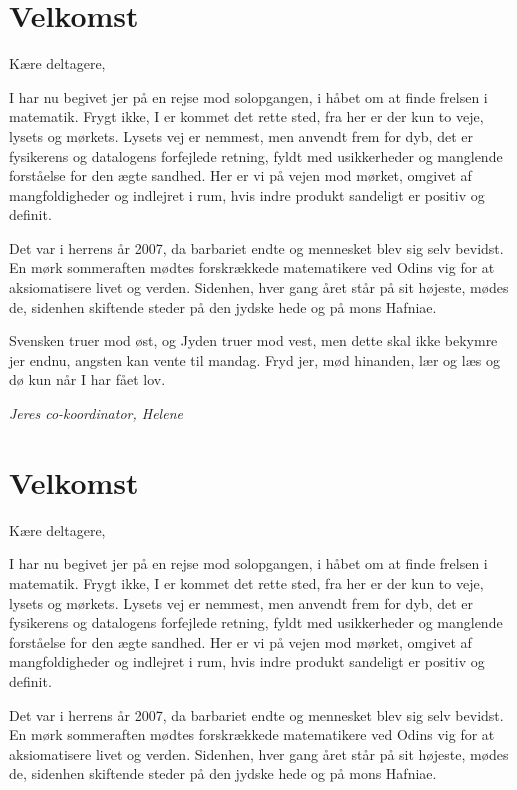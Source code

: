 

\begin{minipage}[b]{0.95\linewidth}
\begin{minipage}[t]{0.47\textwidth}
\vspace{3mm}

\section*{Velkomst}
Kære deltagere,

I har nu begivet jer på en rejse mod solopgangen, i håbet om at finde frelsen i matematik. Frygt ikke, I er kommet det rette sted, fra her er der kun to veje, lysets og mørkets. Lysets vej er nemmest, men anvendt frem for dyb, det er fysikerens og datalogens forfejlede retning, fyldt med usikkerheder og manglende forståelse for den ægte sandhed. Her er vi på vejen mod mørket, omgivet af mangfoldigheder og indlejret i rum, hvis indre produkt sandeligt er positiv og definit.

Det var i herrens år 2007, da barbariet endte og mennesket blev sig selv bevidst. En mørk sommeraften mødtes forskrækkede matematikere ved Odins vig for at aksiomatisere livet og verden. Sidenhen, hver gang året står på sit højeste, mødes de, sidenhen skiftende steder på den jydske hede og på mons Hafniae.

Svensken truer mod øst, og Jyden truer mod vest, men dette skal ikke bekymre jer endnu, angsten kan vente til mandag. Fryd jer, mød hinanden, lær og læs og dø kun når I har fået lov. 

{\flushright\emph{Jeres co-koordinator, Helene}}

\section*{Velkomst}
Kære deltagere,

I har nu begivet jer på en rejse mod solopgangen, i håbet om at finde frelsen i matematik. Frygt ikke, I er kommet det rette sted, fra her er der kun to veje, lysets og mørkets. Lysets vej er nemmest, men anvendt frem for dyb, det er fysikerens og datalogens forfejlede retning, fyldt med usikkerheder og manglende forståelse for den ægte sandhed. Her er vi på vejen mod mørket, omgivet af mangfoldigheder og indlejret i rum, hvis indre produkt sandeligt er positiv og definit.

Det var i herrens år 2007, da barbariet endte og mennesket blev sig selv bevidst. En mørk sommeraften mødtes forskrækkede matematikere ved Odins vig for at aksiomatisere livet og verden. Sidenhen, hver gang året står på sit højeste, mødes de, sidenhen skiftende steder på den jydske hede og på mons Hafniae.


\end{minipage}
\end{minipage}
